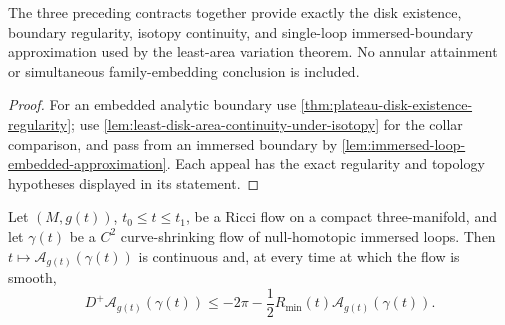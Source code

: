 \begin{lemma}
\label{lem:plateau-disk-moving-boundary-contract}
\notready
The three preceding contracts together provide exactly the disk existence,
boundary regularity, isotopy continuity, and single-loop immersed-boundary
approximation used by the least-area variation theorem.  No annular
attainment or simultaneous family-embedding conclusion is included.
\end{lemma}
\begin{proof}
For an embedded analytic boundary use
\ref{thm:plateau-disk-existence-regularity}; use
\ref{lem:least-disk-area-continuity-under-isotopy} for the collar comparison,
and pass from an immersed boundary by
\ref{lem:immersed-loop-embedded-approximation}.  Each appeal has the exact
regularity and topology hypotheses displayed in its statement.
\end{proof}

\begin{theorem}
\label{thm:least-disk-area-variation-interface}
\notready
Let $(M,g(t))$, $t_0\le t\le t_1$, be a Ricci flow on a compact
three-manifold, and let $\gamma(t)$ be a $C^2$ curve-shrinking flow of
null-homotopic immersed loops.  Then $t\mapsto\mathcal A_{g(t)}(\gamma(t))$
is continuous and, at every time at which the flow is smooth,
\[
 D^+\mathcal A_{g(t)}(\gamma(t))
 \le-2\pi-\frac12R_{\min}(t)
 \mathcal A_{g(t)}(\gamma(t)).
\]
\end{theorem}

